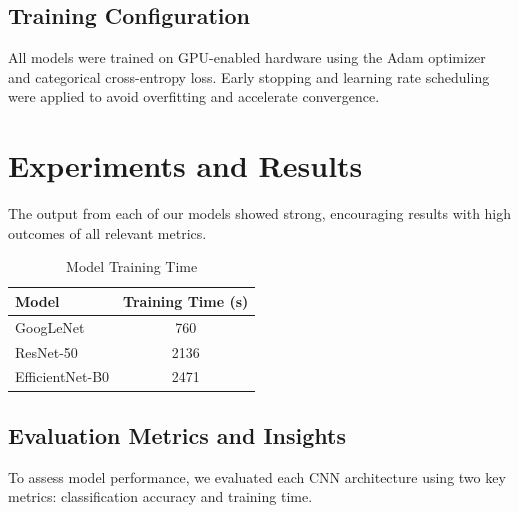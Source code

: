 \documentclass[11pt,twocolumn]{article}
\begin{document}
\subsection{Training Configuration}
All models were trained on GPU-enabled hardware using the Adam optimizer and categorical cross-entropy loss. Early stopping and learning rate scheduling were applied to avoid overfitting and accelerate convergence.




\section{Experiments and Results}
\label{sec:experiments}

The output from each of our models showed strong, encouraging results with high outcomes of all relevant metrics. 


\begin{table}[h]
\centering
\caption{Model Training Time}


\begin{tabular}{lc}
\hline
\textbf{Model} & \textbf{Training Time (s)} \\
\hline

GoogLeNet & 760 \\
ResNet-50 & 2136 \\
EfficientNet-B0 & 2471 \\

\hline
\end{tabular}
\label{tab:training_time}
\end{table}

\subsection{Evaluation Metrics and Insights}
\label{sec:evaluation}

To assess model performance, we evaluated each CNN architecture using two key metrics: classification accuracy and training time.
\end{document}
